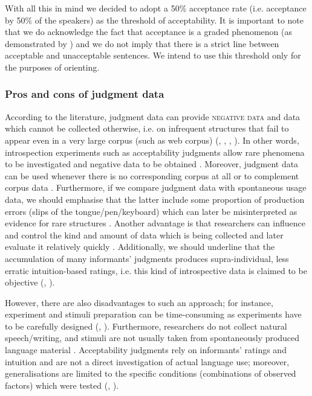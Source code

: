 With all this in mind we decided to adopt a 50\% acceptance rate (i.e. acceptance by 50\% of the speakers) as the threshold of acceptability. It is important to note that we do acknowledge the fact that acceptance is a graded phenomenon (as demonstrated by \cite{LCL17}) and we do not imply that there is a strict line between acceptable and unacceptable sentences. We intend to use this threshold only for the purposes of orienting.

\subsubsection{Pros and cons of judgment data}
\label{Pros and cons of judgment data}
According to the literature, judgment data can provide \textsc{negative} \textsc{data} and data which cannot be collected otherwise, i.e. on infrequent structures that fail to appear even in a very large corpus (such as web corpus)  (\citealt[117]{Hoffmann13}, \citealt[92]{KrugSell13}, \citealt[280]{Rosenbach13}, \citealt[29]{SchutzeSprouse13}). In other words, introspection experiments such as acceptability judgments allow rare phenomena to be investigated and negative data to be obtained \citep[100]{Hoffmann13}. Moreover, judgment data can be used whenever there is no corresponding corpus at all or to complement corpus data \citep[117]{Hoffmann13}. Furthermore, if we compare judgment data with spontaneous usage data, we should emphasise that the latter include some proportion of production errors (slips of the tongue/pen/keyboard) which can later be misinterpreted as evidence for rare structures \citep[29]{SchutzeSprouse13}. Another advantage is that researchers can influence and control the kind and amount of data which is being collected and later evaluate it relatively quickly \citep[92]{KrugSell13}. Additionally, we should underline that the accumulation of many informants’ judgments produces supra-individual, less erratic intuition-based ratings, i.e. this kind of introspective data is claimed to be objective (\citealt[117]{Hoffmann13}, \citealt[92]{KrugSell13}). 

However, there are also disadvantages to such an approach; for instance, experiment and stimuli preparation can be time-consuming as experiments have to be carefully designed (\citealt[117]{Hoffmann13}, \citealt[92]{KrugSell13}). Furthermore, researchers do not collect natural speech/writing, and stimuli are not usually taken from spontaneously produced language material \citep[92]{KrugSell13}. Acceptability judgments rely on informants’ ratings and intuition and are not a direct investigation of actual language use; moreover, generalisations are limited to the specific conditions (combinations of observed factors) which were tested (\citealt[92]{KrugSell13}, \citealt[282]{Rosenbach13}).   

